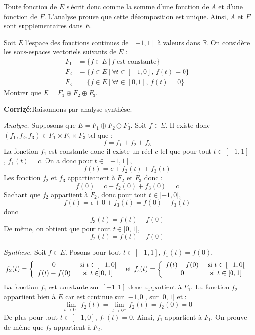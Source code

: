 \documentclass[a4paper,twoside,french,10pt]{VcCours}
\newcommand{\corr}{\textbf{Corrigé:}}
\begin{document}
\medskip

Toute fonction de $E$ s'écrit donc comme la somme d'une fonction de $A$ et d'une fonction de $F$. L'analyse prouve que cette décomposition est unique. Ainsi, $A$ et $F$ sont supplémentaires dans $E$.

\medskip



\begin{Exercice}{} Soit $E$ l'espace des fonctions continues de $[-1,1]$ à valeurs dans $\mathbb{R}$. On considère les sous-espaces vectoriels suivants de $E$ :
\begin{align*}
F_1 &= \lbrace f \in E \, \vert \, f{\text{~est constante}} \rbrace \\
F_2 &= \lbrace f \in E \, \vert \ \forall t \in [ - 1,0], \,  f(t)  = 0 \rbrace \\
F_3 & = \lbrace f \in E \, \vert \ \forall t \in [0,1], \,  f(t) = 0 \rbrace 
\end{align*}
Montrer que $E = F_1 \oplus F_2 \oplus F_3$.
\end{Exercice} 

\corr Raisonnons par analyse-synthèse.

\medskip

\textit{Analyse.} Supposons que $E = F_1 \oplus F_2 \oplus F_3$. Soit $f \in E$. Il existe donc $(f_1,f_2,f_3) \in F_1 \times F_2 \times F_3$ tel que :
$$ f = f_1+ f_2+ f_3$$
La fonction $f_1$ est constante donc il existe un réel $c$ tel que pour tout $t \in [-1,1]$, $f_1(t)=c$. On a donc pour $t \in [-1,1]$,
$$ f(t) = c + f_2(t) + f_3(t)$$
Les fonction $f_2$ et $f_3$ appartiennent à $F_2$ et $F_3$ donc :
$$ f(0) = c + f_2(0)+ f_3(0) = c$$
Sachant que $f_2$ appartient à $F_2$, donc pour tout $t \in [-1,0[$,
$$f(t) = c + 0 + f_3(t) = f(0)+ f_3(t)$$
donc 
$$ f_3(t) = f(t)- f(0)$$
De même, on obtient que pour tout $t \in ]0,1]$,
$$ f_2(t) = f(t)-f(0)$$

\medskip

\textit{Synthèse.} Soit $f \in E$. Posons pour tout $t \in [-1,1]$, $f_1(t) = f(0)$, 
$$ f_2(t) = \left\lbrace \begin{array}{ccl}
0 & \hbox{ si } t \in [-1,0] \\
f(t)-f(0) & \hbox{ si } t \in ]0,1]
\end{array}\right. \; \hbox{ et } f_3(t) = \left\lbrace \begin{array}{ccl}
f(t)-f(0) & \hbox{ si } t \in [-1,0[ \\
0 & \hbox{ si } t \in [0,1]
\end{array}\right.$$
La fonction $f_1$ est constante sur $[-1,1]$ donc appartient à $F_1$. La fonction $f_2$ appartient bien à $E$ car est continue sur $[-1,0[$, sur $]0,1]$ et :
$$ \lim_{t \rightarrow 0^{-}} f_2(t) =  \lim_{t \rightarrow 0^{+}} f_2(t) = f_2(0) = 0$$
De plus pour tout $t \in [-1,0]$, $f_1(t)=0$. Ainsi, $f_1$ appartient à $F_1$. On prouve de même que $f_2$ appartient à $F_2$. 
\end{document}
